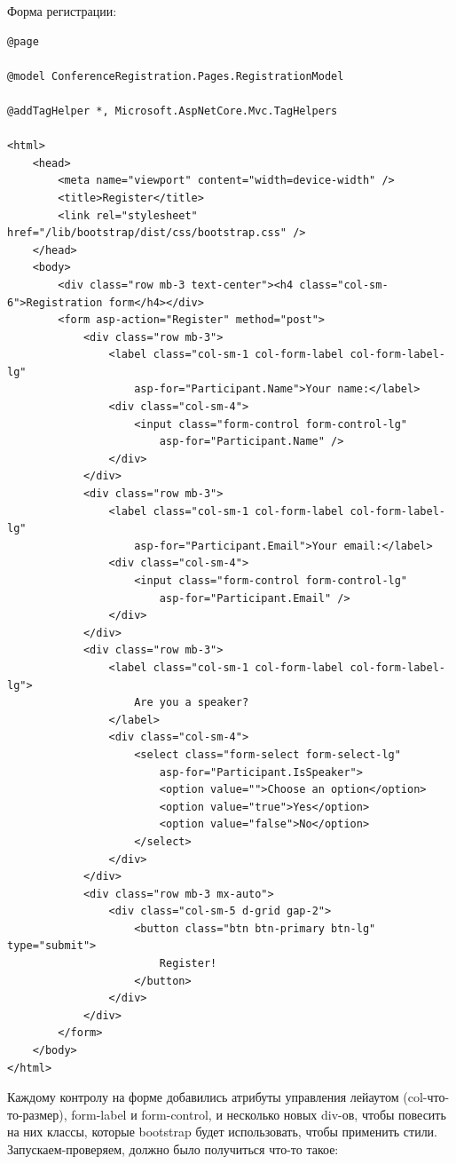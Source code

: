 \documentclass[a5paper]{article}
\begin{document}
Форма регистрации:

\begin{verbatim}
@page

@model ConferenceRegistration.Pages.RegistrationModel

@addTagHelper *, Microsoft.AspNetCore.Mvc.TagHelpers

<html>
    <head>
        <meta name="viewport" content="width=device-width" />
        <title>Register</title>
        <link rel="stylesheet" href="/lib/bootstrap/dist/css/bootstrap.css" />
    </head>
    <body>
        <div class="row mb-3 text-center"><h4 class="col-sm-6">Registration form</h4></div>
        <form asp-action="Register" method="post">
            <div class="row mb-3">
                <label class="col-sm-1 col-form-label col-form-label-lg" 
                    asp-for="Participant.Name">Your name:</label>
                <div class="col-sm-4">
                    <input class="form-control form-control-lg" 
                        asp-for="Participant.Name" />
                </div>
            </div>
            <div class="row mb-3">
                <label class="col-sm-1 col-form-label col-form-label-lg" 
                    asp-for="Participant.Email">Your email:</label>
                <div class="col-sm-4">
                    <input class="form-control form-control-lg" 
                        asp-for="Participant.Email" />
                </div>
            </div>
            <div class="row mb-3">
                <label class="col-sm-1 col-form-label col-form-label-lg">
                    Are you a speaker?
                </label>
                <div class="col-sm-4">
                    <select class="form-select form-select-lg" 
                        asp-for="Participant.IsSpeaker">
                        <option value="">Choose an option</option>
                        <option value="true">Yes</option>
                        <option value="false">No</option>
                    </select>
                </div>
            </div>
            <div class="row mb-3 mx-auto">
                <div class="col-sm-5 d-grid gap-2">
                    <button class="btn btn-primary btn-lg" type="submit">
                        Register!
                    </button>
                </div>
            </div>
        </form>
    </body>
</html>
\end{verbatim}

Каждому контролу на форме добавились атрибуты управления лейаутом (col-что-то-размер), form-label и form-control, и несколько новых div-ов, чтобы повесить на них классы, которые bootstrap будет использовать, чтобы применить стили. Запускаем-проверяем, должно было получиться что-то такое:
\end{document}
